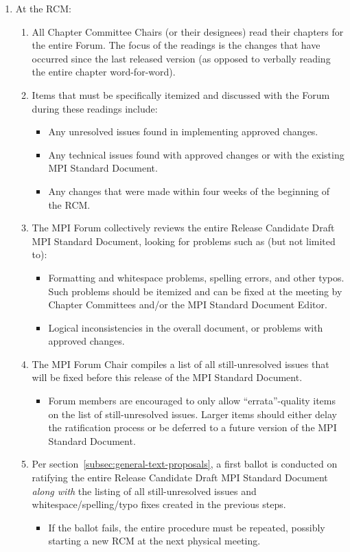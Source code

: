 {{\begin{enumerate}
\item At the RCM:
  \begin{enumerate}
  \item All Chapter Committee Chairs (or their designees) read their
    chapters for the entire Forum.  The focus of the readings is the
    changes that have occurred since the last released version (as
    opposed to verbally reading the entire chapter word-for-word).
  \item Items that must be specifically itemized and discussed with
    the Forum during these readings include:
    \begin{itemize}
    \item Any unresolved issues found in implementing approved
      changes.
    \item Any technical issues found with approved changes or with the
      existing MPI Standard Document.
    \item Any changes that were made within four weeks of the
      beginning of the RCM.
    \end{itemize}

  \item The MPI Forum collectively reviews the entire Release
    Candidate Draft MPI Standard Document, looking for problems such
    as (but not limited to):
    \begin{itemize}
    \item Formatting and whitespace problems, spelling errors, and
      other typos.  Such problems should be itemized and can be fixed
      at the meeting by Chapter Committees and/or the MPI Standard
      Document Editor.
    \item Logical inconsistencies in the overall document, or problems
      with approved changes.
    \end{itemize}

  \item The MPI Forum Chair compiles a list of all still-unresolved
    issues that will be fixed before this release of the MPI Standard
    Document.
    \begin{itemize}
    \item Forum members are encouraged to only allow
      ``errata''-quality items on the list of still-unresolved
      issues.  Larger items should either delay the ratification
      process or be deferred to a future version of the MPI Standard
      Document.
    \end{itemize}

  \item Per section~\ref{subsec:general-text-proposals}, a first
    ballot is conducted on ratifying the entire Release Candidate
    Draft MPI Standard Document {\em along with} the listing of all
    still-unresolved issues and whitespace/spelling/typo fixes created
    in the previous steps.
    \begin{itemize}
    \item If the ballot fails, the entire procedure must be repeated,
      possibly starting a new RCM at the next physical meeting.
    \end{itemize}


\end{enumerate}
\end{enumerate}}}
